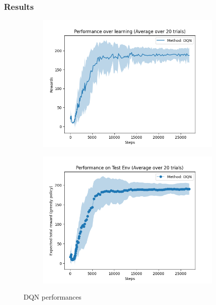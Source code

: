 \documentclass[a4paper]{article}
\begin{document}
\subsubsection*{Results}

\begin{figure}[h!]
    \centering
    \begin{subfigure}[b]{0.4\linewidth}
        \includegraphics[width=\linewidth]{images/dqn_l}
    \end{subfigure}
    \begin{subfigure}[b]{0.4\linewidth}
        \includegraphics[width=\linewidth]{images/dqn_t}
    \end{subfigure}
    \caption{DQN performances}
    \label{fig:dqn}
\end{figure}
\end{document}
